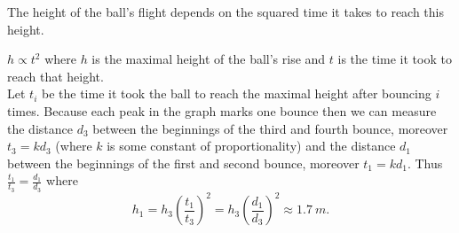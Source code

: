 \hinteng
The height of the ball’s flight depends on the squared time it takes to reach this height.

\solueng
$h \propto t^{2}$ where $h$ is the maximal height of the ball’s rise and $t$ is the time it took to reach that height.\\
Let $t_{i}$ be the time it took the ball to reach the maximal height after bouncing $i$ times. Because each peak in the graph marks one bounce then we can measure the distance $d_{3}$ between the beginnings of the third and fourth bounce, moreover $t_{3}=kd_{3}$ (where $k$ is some constant of proportionality) and the distance $d_{1}$ between the beginnings of the first and second bounce, moreover $t_{1}=kd_{1}$. Thus $\frac{t_{1}}{t_{3}}=\frac{d_{1}}{d_{3}}$ where 
$$h_{1}=h_{3}(\frac{t_{1}}{t_{3}})^{2}=h_{3}(\frac{d_{1}}{d_{3}})^{2} \approx \SI{1,7}{m}.$$
\probend